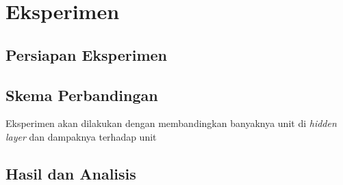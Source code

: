 \section{Eksperimen}

	\subsection{Persiapan Eksperimen}
	\lipsum[1]

	\subsection{Skema Perbandingan}
	Eksperimen akan dilakukan dengan membandingkan banyaknya unit di \textit{hidden layer} dan dampaknya terhadap unit 

	\subsection{Hasil dan Analisis}
	\lipsum[1]